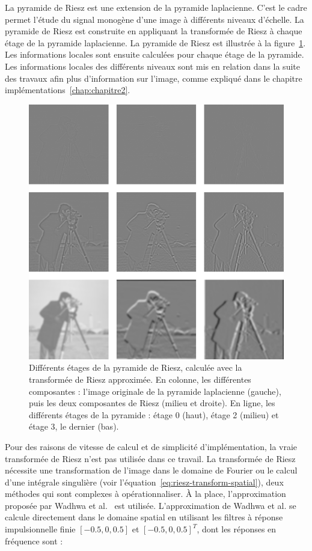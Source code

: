 La \og pyramide de Riesz \fg est une extension de la pyramide laplacienne. C'est le cadre permet l'étude du signal monogène d'une image à différents niveaux d'échelle. La pyramide de Riesz est construite en appliquant la transformée de Riesz à chaque étage de la pyramide laplacienne. La pyramide de Riesz est illustrée à la figure~\ref{fig:riesz-pyramid-cameraman}. Les informations locales sont ensuite calculées pour chaque étage de la pyramide. Les informations locales des différents niveaux sont mis en relation dans la suite des travaux afin plus d'information sur l'image, comme expliqué dans le chapitre implémentations~\ref{chap:chapitre2}.

\bigskip

\begin{figure}
    \centering
    \includegraphics[width=.65\textwidth]{contenu/resources/images/riesz_pyramid_cameraman}
    \caption[Pyramide de Riesz]{Différents étages de la pyramide de Riesz, calculée avec la transformée de Riesz approximée. En colonne, les différentes composantes : l'image originale de la pyramide laplacienne (gauche), puis les deux composantes de Riesz (milieu et droite). En ligne, les différents étages de la pyramide : étage 0 (haut), étage 2 (milieu) et étage 3, le dernier (bas).}
    \label{fig:riesz-pyramid-cameraman}
\end{figure}

Pour des raisons de vitesse de calcul et de simplicité d'implémentation, la vraie transformée de Riesz n'est pas utilisée dans ce travail. La transformée de Riesz nécessite une transformation de l'image dans le domaine de Fourier ou le calcul d'une intégrale singulière (voir l'équation~\ref{eq:riesz-transform-spatial}), deux méthodes qui sont complexes à opérationnaliser. À la place, l'approximation proposée par Wadhwa et al.~\cite{wadhwa_riesz_2014} est utilisée. L'approximation de Wadhwa et al. se calcule directement dans le domaine spatial en utilisant les filtres à réponse impulsionnelle finie $[-0.5, 0, 0.5]$ et $[-0.5, 0, 0.5]^T$, dont les réponses en fréquence sont :

